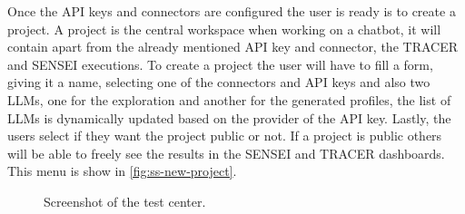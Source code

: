 Once the \ac{API} keys and connectors are configured
the user is ready is to create a project.
A project is the central workspace when working on a chatbot,
it will contain apart from the already mentioned \ac{API} key and connector,
the \ac{TRACER} and SENSEI executions.
To create a project the user will have to fill a form,
giving it a name, selecting one of the connectors and \ac{API} keys
and also two \acp{LLM}, one for the exploration and another for the generated profiles,
the list of \acp{LLM} is dynamically updated based on the provider of the \ac{API} key.
Lastly, the users select if they want the project public or not.
If a project is public others will be able to freely see the results
in the SENSEI and \ac{TRACER} dashboards.
This menu is show in \autoref{fig:ss-new-project}.

\begin{figure}[htpb]
  \centering
  \caption{Screenshot of the test center.}
  \label{fig:ss-test-center}
\end{figure}

